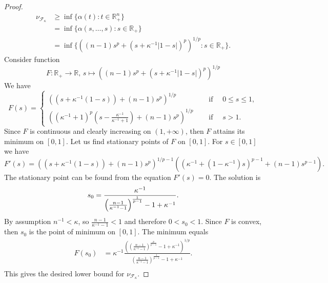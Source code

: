 \documentclass[12pt]{article}
\begin{document}
\begin{proof}
    \[
    \begin{aligned}
        \nu_{\mathcal{F}_{\kappa}}
        &\geq\inf\{\alpha(t) : t\in\mathbb{R}_+^n\} \\
        &=\inf\{\alpha(s,\ldots,s) : s\in\mathbb{R}_+\} \\
        &=\inf\{((n-1)s^p+(s+\kappa^{-1}|1-s|)^p)^{1/p} : s\in\mathbb{R}_+\}.
    \end{aligned}
    \]
    Consider function
    \[
        F:\mathbb{R}_+\to\mathbb{R},\,
        s\mapsto ((n-1)s^p+(s+\kappa^{-1}|1-s|)^p)^{1/p}
    \]
    We have 
    \[
        F(s)=
        \begin{cases}
            ((s+\kappa^{-1}(1-s))+(n-1)s^p)^{1/p}
            \quad&\mbox{ if }\quad 0\leq s\leq 1, \\
            \left(
                (\kappa^{-1}+1)^p
                \left(s-\frac{\kappa^{-1}}{\kappa^{-1}+1}\right)+
                (n-1)s^p
            \right)^{1/p}
            \quad&\mbox{ if }\quad s>1.
        \end{cases}
    \]
    Since $F$ is continuous and clearly increasing on $(1,+\infty)$, 
    then $F$ attains its minimum on $[0, 1]$. Let us find stationary points 
    of $F$ on $[0, 1]$. For $s\in[0,1]$ we have
    \[
        F'(s)=
        ((s+\kappa^{-1}(1-s))+(n-1)s^p)^{1/p-1}
        ((\kappa^{-1}+(1-\kappa^{-1})s)^{p-1}+(n-1)s^{p-1}).
    \]
    The stationary point can be found from the equation $F'(s)=0$. 
    The solution is
    \[
        s_0
        =\frac{
            \kappa^{-1}
        }{
            \left(
                \frac{n-1}{\kappa^{-1}-1}
            \right)^{\frac{1}{p-1}}
            -1+\kappa^{-1}
        }.\\
    \]
    By assumption $n^{-1}<\kappa$, so $\frac{n-1}{\kappa^{-1}-1}<1$ and 
    therefore $0<s_0<1$. Since $F$ is convex, then $s_0$ is the point of 
    minimum on $[0,1]$. The minimum equals
    \[
    \begin{aligned}
        F(s_0)
        &=\kappa^{-1}
            \frac{
                \left(
                    \left(\frac{n-1}{\kappa^{-1}-1}
                    \right)^{\frac{p}{p-1}}
                    -1+\kappa^{-1}
                \right)^{1/p}
            }{
                \left(\frac{n-1}{\kappa^{-1}-1}
                \right)^{\frac{1}{p-1}}
                -1+\kappa^{-1}
            }. \\
    \end{aligned}
    \]
    This gives the desired lower bound for $\nu_{\mathcal{F}_{\kappa}}$.
\end{proof}
\end{document}
